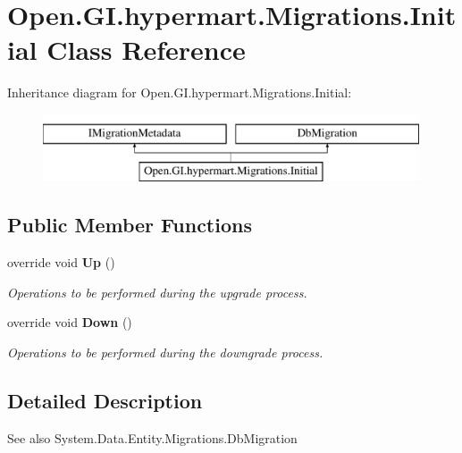 \section{Open.\+G\+I.\+hypermart.\+Migrations.\+Initial Class Reference}
\label{class_open_1_1_g_i_1_1hypermart_1_1_migrations_1_1_initial}


 


Inheritance diagram for Open.\+G\+I.\+hypermart.\+Migrations.\+Initial\+:\begin{figure}[H]
\begin{center}
\leavevmode
\includegraphics[height=2.000000cm]{class_open_1_1_g_i_1_1hypermart_1_1_migrations_1_1_initial}
\end{center}
\end{figure}
\subsection*{Public Member Functions}
\begin{DoxyCompactItemize}
\item 
override void \textbf{ Up} ()
\begin{DoxyCompactList}\small\item\em Operations to be performed during the upgrade process. \end{DoxyCompactList}\item 
override void \textbf{ Down} ()
\begin{DoxyCompactList}\small\item\em Operations to be performed during the downgrade process. \end{DoxyCompactList}\end{DoxyCompactItemize}


\subsection{Detailed Description}


\begin{DoxySeeAlso}{See also}
System.\+Data.\+Entity.\+Migrations.\+Db\+Migration


\end{DoxySeeAlso}



